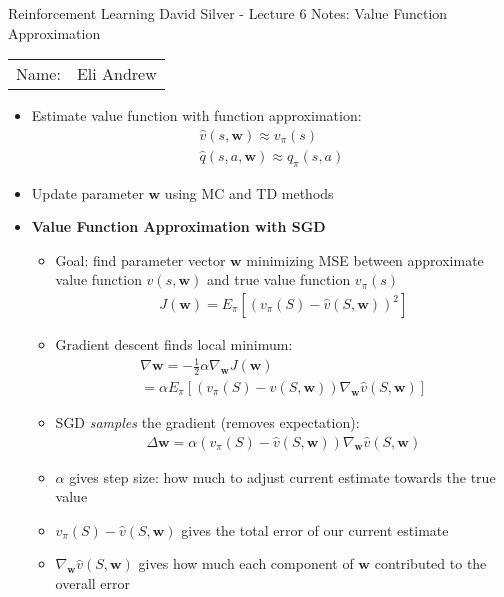 \documentclass[12pt]{article}
\begin{document}
\begin{center}
{\Large Reinforcement Learning David Silver - Lecture 6 Notes: Value Function Approximation}

\begin{tabular}{rl}
Name: & Eli Andrew
\end{tabular}
\end{center}

  \begin{itemize}
    \item Estimate value function with function approximation:
    \begin{gather*}
      \hat{v}(s, \textbf{w}) \approx v_\pi(s) \\
      \hat{q}(s, a, \textbf{w}) \approx q_\pi(s,a)
    \end{gather*}
    \item Update parameter $\textbf{w}$ using MC and TD methods
    \item \textbf{Value Function Approximation with SGD}
    \begin{itemize}
      \item Goal: find parameter vector $\textbf{w}$ minimizing MSE between
      approximate value function $\hat{v}(s, \textbf{w})$ and true value function $v_\pi(s)$
      \begin{gather*}
        J(\textbf{w}) = E_\pi[(v_\pi(S) - \hat{v}(S, \textbf{w}))^2]
      \end{gather*}
      \item Gradient descent finds local minimum:
      \begin{gather*}
        \nabla\textbf{w} = -\frac{1}{2}\alpha\nabla_{\textbf{w}}J(\textbf{w}) \\
        = \alpha E_\pi[(v_\pi(S) - \hat{v}(S, \textbf{w}))\nabla_{\textbf{w}}\hat{v}(S, \textbf{w})]
      \end{gather*}
      \item SGD \textit{samples} the gradient (removes expectation):
      \begin{gather*}
        \Delta\textbf{w} = \alpha(v_\pi(S) - \hat{v}(S, \textbf{w}))\nabla_{\textbf{w}}\hat{v}(S, \textbf{w})
      \end{gather*}
      \item $\alpha$ gives step size: how much to adjust current estimate towards the true value
      \item $v_\pi(S) - \hat{v}(S, \textbf{w})$ gives the total error of our current estimate
      \item $\nabla_{\textbf{w}}\hat{v}(S, \textbf{w})$ gives how much each component of $\textbf{w}$ contributed to the overall error

\end{itemize}
\end{itemize}
\end{document}
